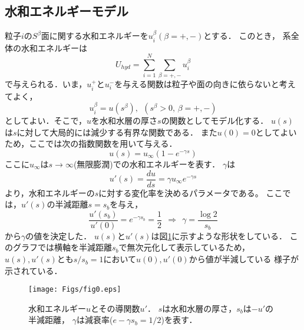 \subsection{水和エネルギーモデル}
粒子$i$の$S^\beta$面に関する水和エネルギーを$u^\beta_i(\beta=+,-)$とする．
このとき， 系全体の水和エネルギーは
\begin{equation}
	U_{hyd}=\sum_{i=1}^N\sum_{\beta=+,-} u_i^{\beta}
	\label{eqn:}
\end{equation}
で与えられる．いま，$u^+_i$と$u^-_i$を与える関数は粒子や面の向きに依らないと考えてよく，
\begin{equation}
	u^\beta_i= u(s^\beta), \ \ (s^\beta>0,\, \beta=+,-)
	\label{eqn:}
\end{equation}
としてよい．そこで，$u$を水和水層の厚さ$s$の関数としてモデル化する．
$u(s)$は$s$に対して大局的には減少する有界な関数である．
また$u(0)=0$としてよいため，ここでは次の指数関数を用いて与える．
\begin{equation}
	u(s)=u_{\infty} \left(1-e^{-\gamma s} \right)
	\label{eqn:u_s}
\end{equation}
ここに$u_{\infty}$は$s\rightarrow \infty$(無限膨潤)での水和エネルギーを表す．
$\gamma$は
\begin{equation}
	u'(s)=\frac{du}{ds}=\gamma u_{\infty} e^{-\gamma s}
	\label{eqn:ud_s}
\end{equation}
より，水和エネルギーの$s$に対する変化率を決めるパラメータである。
ここでは，$u'(s)$の半減距離$s=s_b$を与え，
\begin{equation}
	\frac{u'\left(s_b\right)}{u'(0)}=e^{-\gamma s_b}=\frac{1}{2} 
	\ \ \Rightarrow \ \
	\gamma=\frac{\log 2}{s_b}
	\label{eqn:}
\end{equation}
から$\gamma$の値を決定した．
$u(s)$と$u'(s)$は図\ref{fig:fig0}に示すような形状をしている．
このグラフでは横軸を半減距離$s_b$で無次元化して表示しているため，
$u(s),u'(s)$とも$s/s_b=1$において$u(0),u'(0)$から値が半減している
様子が示されている．
\begin{figure}[h]
	\begin{center}
	\texttt{[image: Figs/fig0.eps]} 
	\end{center}
	\caption{
		水和エネルギー$u$とその導関数$u'$．
		$s$は水和水層の厚さ，$s_b$は$-u'$の半減距離，
		$\gamma$は減衰率($e-\gamma s_b=1/2$)を表す．
	} 
	\label{fig:fig0}
\end{figure}
